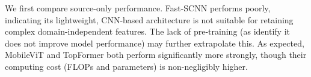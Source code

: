 \documentclass[a4paper,12pt]{report}
\begin{document}
We first compare source-only performance. Fast-SCNN performs poorly, indicating its lightweight, CNN-based architecture is not suitable for retaining complex domain-independent features. The lack of pre-training (as \cite{poudel_fast-scnn_2019} identify it does not improve model performance) may further extrapolate this. As expected, MobileViT and TopFormer both perform significantly more strongly, though their computing cost (FLOPs and parameters) is non-negligibly higher.

\begin{table}[]
\end{table}
\end{document}
